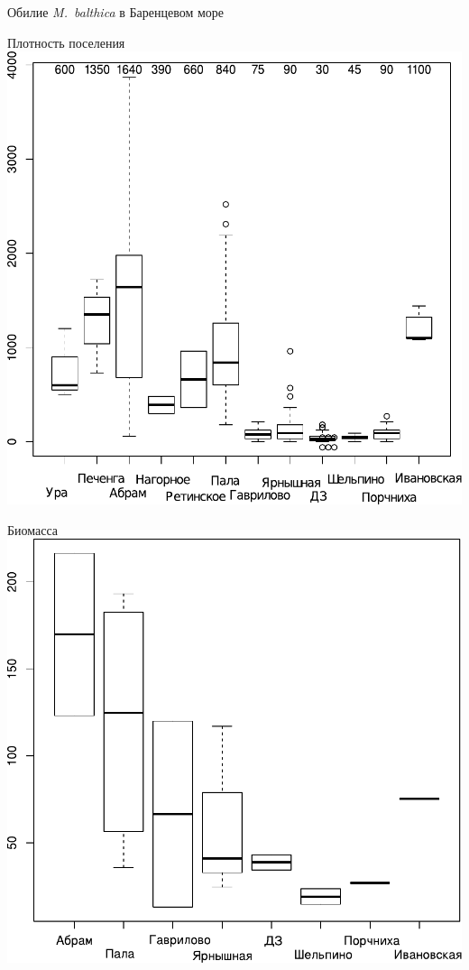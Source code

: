 \documentclass{beamer}
\begin{document}
\begin{frame}{Обилие {\it M.~balthica} в Баренцевом море}
	\begin{minipage}[t]{.49\linewidth}
		\begin{center}
		{\footnotesize Плотность поселения}
			\includegraphics[width=\textwidth]{N2_area_Barents1.pdf}
		\end{center}
	\end{minipage}
%
	\begin{minipage}[t]{.49\linewidth}
		\begin{center}
		{\footnotesize Биомасса}
			\includegraphics[width=\textwidth]{B_Barents_uchastki_ru1.pdf}
		\end{center}
	\end{minipage}


\end{frame}
\end{document}
